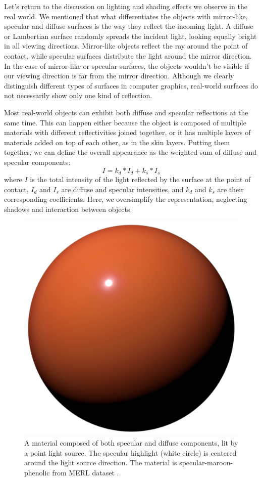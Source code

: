 Let's return to the discussion on lighting and shading effects we observe in the real world. We mentioned that what differentiates the objects with mirror-like,  specular and diffuse surfaces is the way they reflect the incoming light. A diffuse or Lambertian surface randomly spreads the incident light, looking equally bright in all viewing directions. Mirror-like objects reflect the ray around the point of contact, while specular surfaces distribute the light around the mirror direction. In the case of mirror-like or specular surfaces, the objects wouldn't be visible if our viewing direction is far from the mirror direction. Although we clearly distinguish different types of surfaces in computer graphics, real-world surfaces do not necessarily show only one kind of reflection.


Most real-world objects can exhibit both diffuse and specular reflections at the same time. This can happen either because the object is composed of multiple materials with different reflectivities joined together, or it has multiple layers of materials added on top of each other, as in the skin layers. Putting them together, we can define the overall appearance as the weighted sum of diffuse and specular components: 
\begin{equation}
I = k_d * I_d + k_s * I_s
\end{equation}
where $I$ is the total intensity of the light reflected by the surface at the point of contact, $I_d$ and $I_s$  are diffuse and specular intensities, and $k_d$ and $k_s$ are their corresponding coefficients. Here, we oversimplify the representation, neglecting shadows and interaction between objects.



\begin{figure}
  \centering
   \includegraphics[width=0.5\linewidth]{Images/specular+diffuse.png}
   \caption{A material composed of both specular and diffuse components, lit by a point light source. The specular highlight (white circle) is centered around the light source direction. The material is specular-maroon-phenolic from MERL dataset \cite{Matusik2003jul}.}
   \label{fig:diffuse+spec}
\end{figure}


